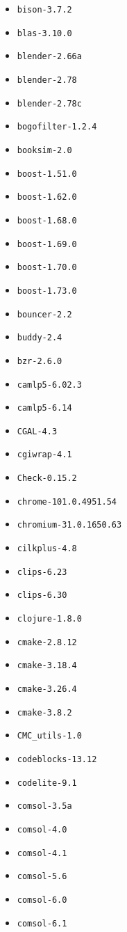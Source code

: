 \begin{multicols}{3}
\begin{itemize}
\item \verb|bison-3.7.2|
\item \verb|blas-3.10.0|
\item \verb|blender-2.66a|
\item \verb|blender-2.78|
\item \verb|blender-2.78c|
\item \verb|bogofilter-1.2.4|
\item \verb|booksim-2.0|
\item \verb|boost-1.51.0|
\item \verb|boost-1.62.0|
\item \verb|boost-1.68.0|
\item \verb|boost-1.69.0|
\item \verb|boost-1.70.0|
\item \verb|boost-1.73.0|
\item \verb|bouncer-2.2|
\item \verb|buddy-2.4|
\item \verb|bzr-2.6.0|
\item \verb|camlp5-6.02.3|
\item \verb|camlp5-6.14|
\item \verb|CGAL-4.3|
\item \verb|cgiwrap-4.1|
\item \verb|Check-0.15.2|
\item \verb|chrome-101.0.4951.54|
\item \verb|chromium-31.0.1650.63|
\item \verb|cilkplus-4.8|
\item \verb|clips-6.23|
\item \verb|clips-6.30|
\item \verb|clojure-1.8.0|
\item \verb|cmake-2.8.12|
\item \verb|cmake-3.18.4|
\item \verb|cmake-3.26.4|
\item \verb|cmake-3.8.2|
\item \verb|CMC_utils-1.0|
\item \verb|codeblocks-13.12|
\item \verb|codelite-9.1|
\item \verb|comsol-3.5a|
\item \verb|comsol-4.0|
\item \verb|comsol-4.1|
\item \verb|comsol-5.6|
\item \verb|comsol-6.0|
\item \verb|comsol-6.1|

\end{itemize}
\end{multicols}
